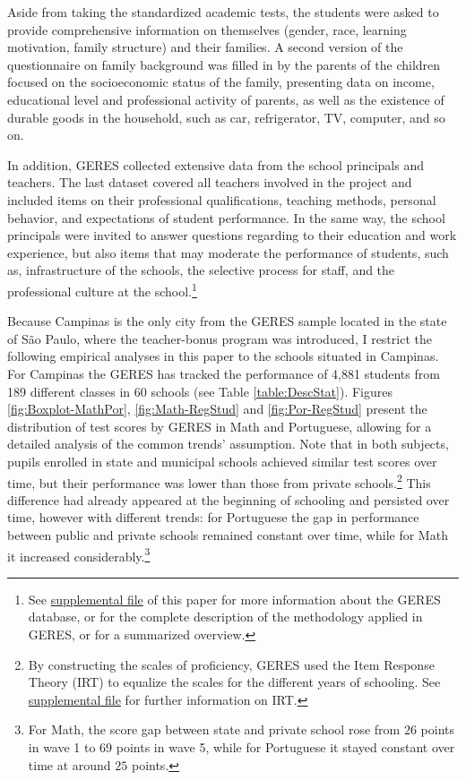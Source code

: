 \documentclass[a4paper, 12pt]{article}
\begin{document}
Aside from taking the standardized academic tests, the students were asked to provide comprehensive information on themselves (gender, race, learning motivation, family structure) and their families. A second version of the questionnaire on family background was filled in by the parents of the children focused on the socioeconomic status of the family, presenting data on income, educational level and professional activity of parents, as well as the existence of durable goods in the household, such as car, refrigerator, TV, computer, and so on.

In addition, GERES collected extensive data from the school principals and teachers. The last dataset covered all teachers involved in the project and included items on their professional qualifications, teaching methods, personal behavior, and expectations of student performance. In the same way, the school principals were invited to answer questions regarding to their education and work experience, but also items that may moderate the performance of students, such as, infrastructure of the schools, the selective process for staff, and the professional culture at the school.\footnote{See \hyperref[SuppMaterial]{supplemental file} of this paper for more information about the GERES database, or \citet{brooke2011geres} for the complete description of the methodology applied in GERES, or \citet{franco2008estudo} for a summarized overview.}


Because Campinas is the only city from the GERES sample located in the state of São Paulo, where the teacher-bonus program was introduced, I restrict the following empirical analyses in this paper to the schools situated in Campinas. For Campinas the GERES has tracked the performance of 4,881 students from 189 different classes in 60 schools (see Table \ref{table:DescStat}). Figures \ref{fig:Boxplot-MathPor}, \ref{fig:Math-RegStud} and \ref{fig:Por-RegStud} present the distribution of test scores by GERES in Math and Portuguese, allowing for a detailed analysis of the common trends’ assumption. Note that in both subjects, pupils enrolled in state and municipal schools achieved similar test scores over time, but their performance was lower than those from private schools.\footnote{By constructing the scales of proficiency, GERES used the Item Response Theory (IRT) to equalize the scales for the different years of schooling. See \hyperref[SuppMaterial]{supplemental file} for further information on IRT.} This difference had already appeared at the beginning of schooling and persisted over time, however with different trends: for Portuguese the gap in performance between public and private schools remained constant over time, while for Math it increased considerably.\footnote{For Math, the score gap between state and private school rose from $26$ points in wave 1 to $69$ points in wave 5, while for Portuguese it stayed constant over time at around $25$ points.}
\end{document}
